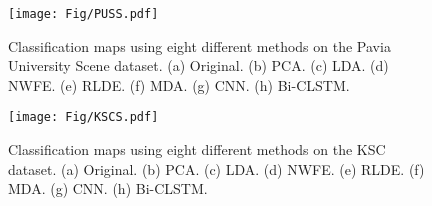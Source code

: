\documentclass[12pt,onecolumn]{IEEEtran}
\begin{document}
\begin{spacing}{2}
\begin{figure}[!htb]
  \centering
  \texttt{[image: Fig/PUSS.pdf]}\\
  \caption{Classification maps using eight different methods on the Pavia University Scene dataset. (a) Original. (b) PCA. (c) LDA. (d) NWFE. (e) RLDE. (f) MDA. (g) CNN. (h) Bi-CLSTM.}\label{PUS_rshow}
\end{figure}


\begin{figure}[htb]
  \centering
  \texttt{[image: Fig/KSCS.pdf]}\\
  \caption{Classification maps using eight different methods on the KSC dataset. (a) Original. (b) PCA. (c) LDA. (d) NWFE. (e) RLDE. (f) MDA. (g) CNN. (h) Bi-CLSTM.}\label{KSC_rshow}
\end{figure}


\end{spacing}
\end{document}
